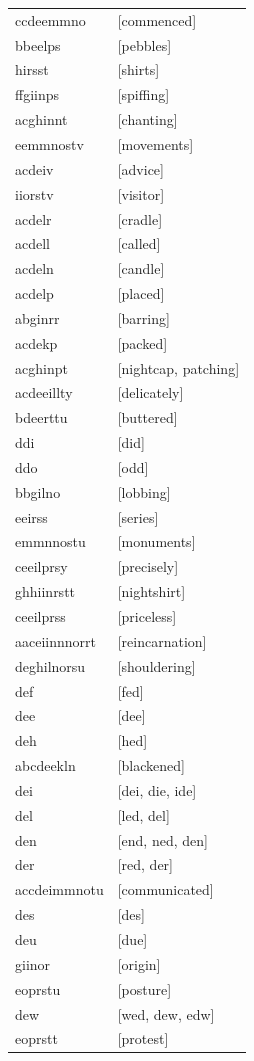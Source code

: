 \documentclass{article}
\begin{document}
\begin{tabular}{ll}
ccdeemmno & [commenced] \\
bbeelps & [pebbles] \\
hirsst & [shirts] \\
ffgiinps & [spiffing] \\
acghinnt & [chanting] \\
eemmnostv & [movements] \\
acdeiv & [advice] \\
iiorstv & [visitor] \\
acdelr & [cradle] \\
acdell & [called] \\
acdeln & [candle] \\
acdelp & [placed] \\
abginrr & [barring] \\
acdekp & [packed] \\
acghinpt & [nightcap, patching] \\
acdeeillty & [delicately] \\
bdeerttu & [buttered] \\
ddi & [did] \\
ddo & [odd] \\
bbgilno & [lobbing] \\
eeirss & [series] \\
emmnnostu & [monuments] \\
ceeilprsy & [precisely] \\
ghhiinrstt & [nightshirt] \\
ceeilprss & [priceless] \\
aaceiinnnorrt & [reincarnation] \\
deghilnorsu & [shouldering] \\
def & [fed] \\
dee & [dee] \\
deh & [hed] \\
abcdeekln & [blackened] \\
dei & [dei, die, ide] \\
del & [led, del] \\
den & [end, ned, den] \\
der & [red, der] \\
accdeimmnotu & [communicated] \\
des & [des] \\
deu & [due] \\
giinor & [origin] \\
eoprstu & [posture] \\
dew & [wed, dew, edw] \\
eoprstt & [protest] \\

\end{tabular}
\end{document}
